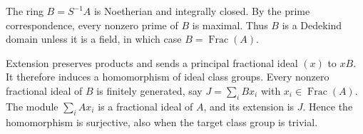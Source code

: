 The ring $B=S^{-1}A$ is Noetherian and integrally closed. By the prime correspondence, every nonzero prime of $B$ is maximal. Thus $B$ is a Dedekind domain unless it is a field, in which case $B=\operatorname{Frac}(A)$.

Extension preserves products and sends a principal fractional ideal $(x)$ to $xB$. It therefore induces a homomorphism of ideal class groups. Every nonzero fractional ideal of $B$ is finitely generated, say $J=\sum_iBx_i$ with $x_i\in\operatorname{Frac}(A)$. The module $\sum_iAx_i$ is a fractional ideal of $A$, and its extension is $J$. Hence the homomorphism is surjective, also when the target class group is trivial.
